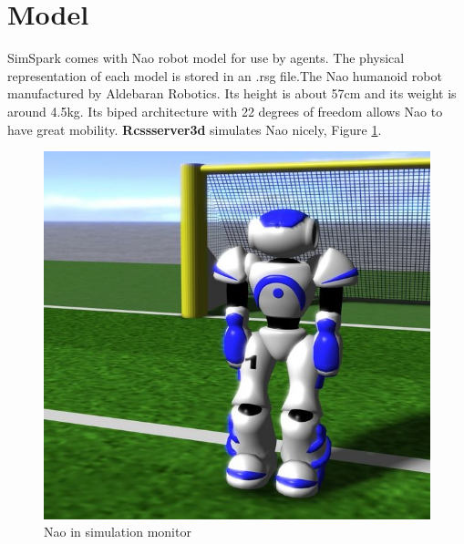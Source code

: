 \section{Model}
SimSpark comes with Nao robot model for use by agents. The physical representation of each model is stored in an .rsg file.The Nao humanoid robot manufactured by Aldebaran Robotics. Its height is about 57cm and its weight is around 4.5kg. Its biped architecture with 22 degrees of freedom allows Nao to have great mobility. {\bf Rcssserver3d} simulates Nao nicely, Figure \ref{fig:Naoinsimulationscreen}.\cite{SimSpark}
\begin{figure}[ht]
\centering
  \includegraphics[scale=0.3]{Chapter2/figures/629px-Models-nao.jpg}
  \caption{Nao in simulation monitor} 
  \label{fig:Naoinsimulationscreen}
\end{figure}